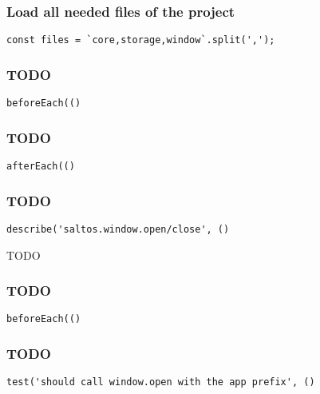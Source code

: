 \documentclass[a4paper]{article}
\begin{document}
\hypertarget{toc723}{}
\subsubsection{Load all needed files of the project}

\begin{lstlisting}
const files = `core,storage,window`.split(',');
\end{lstlisting}

\hypertarget{toc724}{}
\subsubsection{TODO}

\begin{lstlisting}
beforeEach(()
\end{lstlisting}

\hypertarget{toc725}{}
\subsubsection{TODO}

\begin{lstlisting}
afterEach(()
\end{lstlisting}

\hypertarget{toc726}{}
\subsubsection{TODO}

\begin{lstlisting}
describe('saltos.window.open/close', ()
\end{lstlisting}

TODO

\hypertarget{toc727}{}
\subsubsection{TODO}

\begin{lstlisting}
beforeEach(()
\end{lstlisting}

\hypertarget{toc728}{}
\subsubsection{TODO}

\begin{lstlisting}
test('should call window.open with the app prefix', ()
\end{lstlisting}
\end{document}
